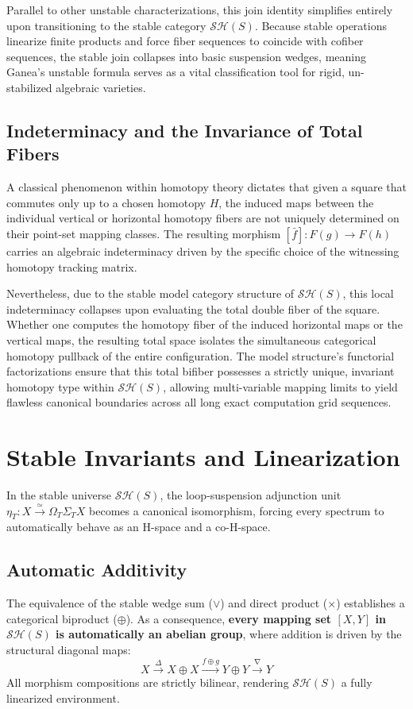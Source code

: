 \documentclass[11pt,oneside]{article}
\begin{document}
Parallel to other unstable characterizations, this join identity simplifies entirely upon transitioning to the stable category $\mathcal{S}\mathcal{H}(S)$. Because stable operations linearize finite products and force fiber sequences to coincide with cofiber sequences, the stable join collapses into basic suspension wedges, meaning Ganea's unstable formula serves as a vital classification tool for rigid, un-stabilized algebraic varieties.

\subsection{Indeterminacy and the Invariance of Total Fibers}
A classical phenomenon within homotopy theory dictates that given a square that commutes only up to a chosen homotopy $H$, the induced maps between the individual vertical or horizontal homotopy fibers are not uniquely determined on their point-set mapping classes. The resulting morphism $[\bar{f}]: F(g) \to F(h)$ carries an algebraic indeterminacy driven by the specific choice of the witnessing homotopy tracking matrix.

Nevertheless, due to the stable model category structure of $\mathcal{S}\mathcal{H}(S)$, this local indeterminacy collapses upon evaluating the total double fiber of the square. Whether one computes the homotopy fiber of the induced horizontal maps or the vertical maps, the resulting total space isolates the simultaneous categorical homotopy pullback of the entire configuration. The model structure’s functorial factorizations ensure that this total bifiber possesses a strictly unique, invariant homotopy type within $\mathcal{S}\mathcal{H}(S)$, allowing multi-variable mapping limits to yield flawless canonical boundaries across all long exact computation grid sequences.

\section{Stable Invariants and Linearization}
In the stable universe $\mathcal{S}\mathcal{H}(S)$, the loop-suspension adjunction unit $\eta_T: X \xrightarrow{\simeq} \Omega_T \Sigma_T X$ becomes a canonical isomorphism, forcing every spectrum to automatically behave as an H-space and a co-H-space.

\subsection{Automatic Additivity}
The equivalence of the stable wedge sum ($\vee$) and direct product ($\times$) establishes a categorical biproduct ($\oplus$). As a consequence, \textbf{every mapping set $[X,Y]$ in $\mathcal{S}\mathcal{H}(S)$ is automatically an abelian group}, where addition is driven by the structural diagonal maps:
\[ X \xrightarrow{\Delta} X \oplus X \xrightarrow{f \oplus g} Y \oplus Y \xrightarrow{\nabla} Y \]
All morphism compositions are strictly bilinear, rendering $\mathcal{S}\mathcal{H}(S)$ a fully linearized environment.
\end{document}
